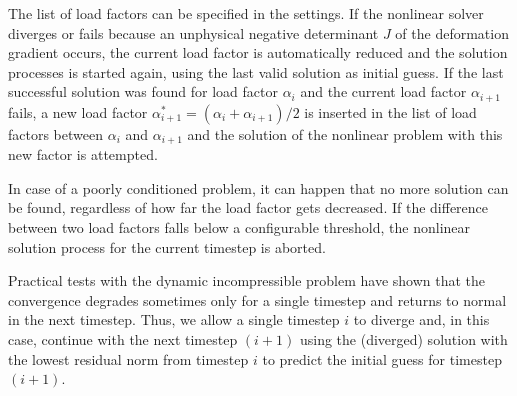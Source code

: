The list of load factors can be specified in the settings. If the nonlinear solver diverges or fails because an unphysical negative determinant $J$ of the deformation gradient occurs, the current load factor is automatically reduced and the solution processes is started again, using the last valid solution as initial guess. If the last successful solution was found for load factor $\alpha_i$ and the current load factor $\alpha_{i+1}$ fails, a new load factor $\alpha^\ast_{i+1} = (\alpha_i + \alpha_{i+1})/2$ is inserted in the list of load factors between $\alpha_i$ and $\alpha_{i+1}$ and the solution of the nonlinear problem with this new factor is attempted. 

In case of a poorly conditioned problem, it can happen that no more solution can be found, regardless of how far the load factor gets decreased. If the difference between two load factors falls below a configurable threshold, the nonlinear solution process for the current timestep is aborted.

Practical tests with the dynamic incompressible problem have shown that the convergence degrades sometimes only for a single timestep and returns to normal in the next timestep. Thus, we allow a single timestep $i$ to diverge and, in this case, continue with the next timestep $(i+1)$ using the (diverged) solution with the lowest residual norm from timestep $i$ to predict the initial guess for timestep $(i+1)$.

